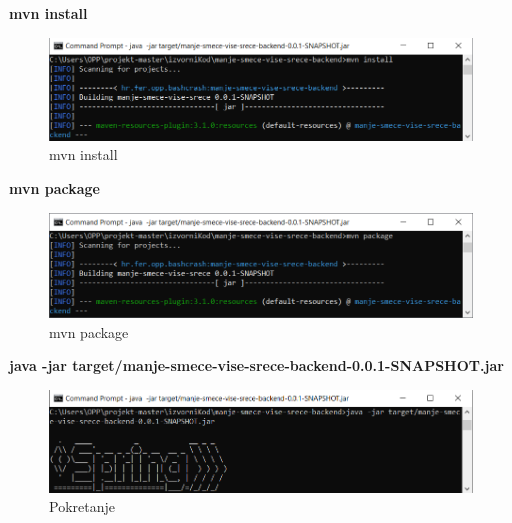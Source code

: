 \begin{packed_enum}
    		      \item \textbf{mvn install}
    		            \begin{figure}[H]
    					\includegraphics[scale=0.9]{slike/backend/backendinstall.png}
    					\centering
    					\caption{mvn install}
    					\label{fig:mvn-install}
    		            \end{figure}
    		            
    		      \item \textbf{mvn package}
    		            \begin{figure}[H]
    					\includegraphics[scale=0.9]{slike/backend/backendpackage.png}
    					\centering
    					\caption{mvn package}
    					\label{fig:mvn package}
    		            \end{figure}
    		            
    		      \item \textbf{java -jar target/manje-smece-vise-srece-backend-0.0.1-SNAPSHOT.jar}
    		            \begin{figure}[H]
    					\includegraphics[scale=0.9]{slike/backend/backendjar.png}
    					\centering
    					\caption{Pokretanje}
    					\label{fig:pokretanje}
    		            \end{figure}
  	   
				
				\end{packed_enum}
		   	
